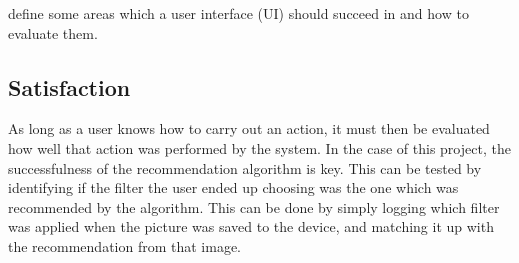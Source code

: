 \documentclass[a4paper,12pt]{article}
\begin{document}
    \cite{nielsen1990heuristic} define some areas which a user interface (UI) should succeed in and how to evaluate them.

  \subsection{Satisfaction}
    As long as a user knows how to carry out an action, it must then be evaluated how well that action was performed by the system. In the case of this project, the successfulness of the recommendation algorithm is key. This can be tested by identifying if the filter the user ended up choosing was the one which was recommended by the algorithm. This can be done by simply logging which filter was applied when the picture was saved to the device, and matching it up with the recommendation from that image.

\newpage
\singlespacing



\end{document}
